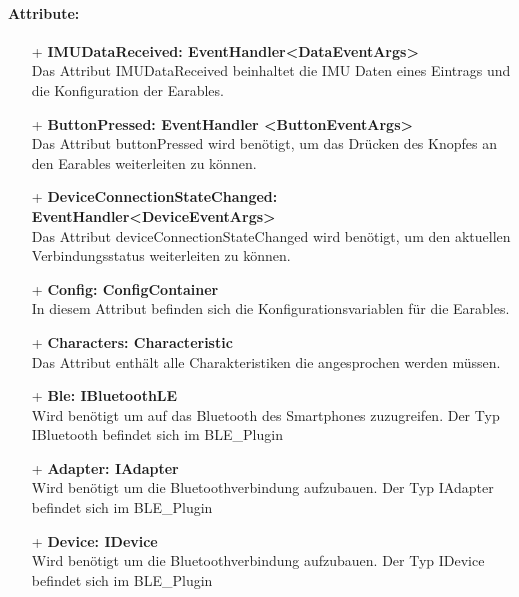 \documentclass[a4paper,12pt]{article}
\begin{document}
\paragraph{Attribute:}
\begin{itemize}
	\item[+] \textbf{IMUDataReceived: EventHandler<DataEventArgs>}\\Das Attribut IMUDataReceived beinhaltet die IMU Daten eines Eintrags und die Konfiguration der \Gls{Earables}.
	\item[+] \textbf{ButtonPressed: EventHandler <ButtonEventArgs>}\\ Das Attribut buttonPressed wird benötigt, um das Drücken des Knopfes an den \Gls{Earables} weiterleiten zu können.
	\item[+] \textbf{DeviceConnectionStateChanged: EventHandler<DeviceEventArgs>}\\ Das Attribut deviceConnectionStateChanged wird benötigt, um den aktuellen Verbindungsstatus weiterleiten zu können.
	\item[+] \textbf{Config: ConfigContainer}\\ In diesem Attribut befinden sich die Konfigurationsvariablen für die \Gls{Earables}.
	\item[+] \textbf{Characters: Characteristic}\\ Das Attribut enthält alle Charakteristiken die angesprochen werden müssen.
	\item[+] \textbf{Ble: IBluetoothLE}\\ Wird benötigt um auf das Bluetooth des Smartphones zuzugreifen. Der Typ IBluetooth befindet sich im BLE\_Plugin
	\item[+] \textbf{Adapter: IAdapter}\\ Wird benötigt um die Bluetoothverbindung aufzubauen. Der Typ  IAdapter befindet sich im BLE\_Plugin
	\item[+] \textbf{Device: IDevice}\\ Wird benötigt um die Bluetoothverbindung aufzubauen. Der Typ  IDevice befindet sich im BLE\_Plugin
\end{itemize}
\end{document}
